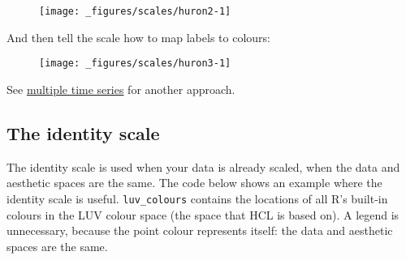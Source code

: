 \begin{figure}[H]
  \centering
  \texttt{[image: \_figures/scales/huron2-1]}
\end{figure}

And then tell the scale how to map labels to colours:

\begin{Shaded}
\begin{Highlighting}[]
\OperatorTok{+}
\StringTok{  }\NormalTok{(}\NormalTok{(}\OperatorTok{+}\StringTok{ }\NormalTok{, } \NormalTok{)) }\OperatorTok{+}\StringTok{ }
\StringTok{  }\NormalTok{(}\NormalTok{(}\OperatorTok{-}\StringTok{ }\NormalTok{, } \NormalTok{)) }\OperatorTok{+}\StringTok{ }
\StringTok{  }\NormalTok{(}\NormalTok{, }
     \NormalTok{(}\NormalTok{ =}\NormalTok{, }\NormalTok{ =}\NormalTok{)}
\NormalTok{  )}
\end{Highlighting}
\end{Shaded}

\begin{figure}[H]
  \centering
  \texttt{[image: \_figures/scales/huron3-1]}
\end{figure}

See \protect\hyperlink{sec:spread-gather}{multiple time series} for
another approach.

\hypertarget{sub:scale-identity}{%
\subsection{The identity scale}\label{sub:scale-identity}}

The identity scale is used when your data is already scaled, when the
data and aesthetic spaces are the same. The code below shows an example
where the identity scale is useful. \texttt{luv\_colours} contains the
locations of all R's built-in colours in the LUV colour space (the space
that HCL is based on). A legend is unnecessary, because the point colour
represents itself: the data and aesthetic spaces are the same.
 

